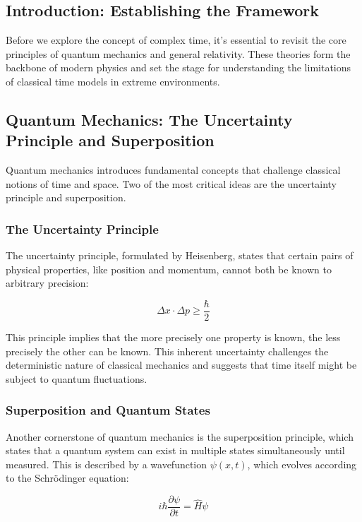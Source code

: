 \documentclass{article}
\begin{document}
\subsection{Introduction: Establishing the Framework}

Before we explore the concept of complex time, it's essential to revisit the core principles of quantum mechanics and general relativity. These theories form the backbone of modern physics and set the stage for understanding the limitations of classical time models in extreme environments.

\subsection{Quantum Mechanics: The Uncertainty Principle and Superposition}

Quantum mechanics introduces fundamental concepts that challenge classical notions of time and space. Two of the most critical ideas are the uncertainty principle and superposition.

\subsubsection{The Uncertainty Principle}

The uncertainty principle, formulated by Heisenberg, states that certain pairs of physical properties, like position and momentum, cannot both be known to arbitrary precision:

\[
\Delta x \cdot \Delta p \geq \frac{\hbar}{2}
\]

This principle implies that the more precisely one property is known, the less precisely the other can be known. This inherent uncertainty challenges the deterministic nature of classical mechanics and suggests that time itself might be subject to quantum fluctuations.

\subsubsection{Superposition and Quantum States}

Another cornerstone of quantum mechanics is the superposition principle, which states that a quantum system can exist in multiple states simultaneously until measured. This is described by a wavefunction \( \psi(x, t) \), which evolves according to the Schrödinger equation:

\[
i \hbar \frac{\partial \psi}{\partial t} = \hat{H} \psi
\]
\end{document}

